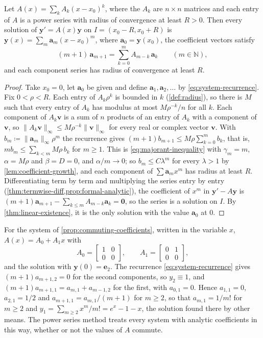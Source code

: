 \begin{proposition}
\label{prop:analytic-systems}
Let $A(x)=\sum_kA_k(x-x_0)^k$, where the $A_k$ are $n\times n$ matrices and each entry of $A$ is a power series with radius of convergence at least $R>0$. Then every solution of $\mathbf y'=A(x)\mathbf y$ on $I=(x_0-R,x_0+R)$ is $\mathbf y(x)=\sum_m\mathbf a_m(x-x_0)^m$, where $\mathbf a_0=\mathbf y(x_0)$, the coefficient vectors satisfy
\begin{equation}
(m+1)\,\mathbf a_{m+1}=\sum_{k=0}^mA_{m-k}\,\mathbf a_k\qquad(m\in\mathbb N),
\label{eq:system-recurrence}
\end{equation}
and each component series has radius of convergence at least $R$.
\end{proposition}

\begin{proof}
Take $x_0=0$, let $\mathbf a_0$ be given and define $\mathbf a_1,\mathbf a_2,\ldots$ by \eqref{eq:system-recurrence}. Fix $0<\rho<R$. Each entry of $A_k\rho^k$ is bounded in $k$ (\cref{def:radius}), so there is $M$ such that every entry of $A_k$ has modulus at most $M\rho^{-k}/n$ for all $k$. Each component of $A_k\mathbf v$ is a sum of $n$ products of an entry of $A_k$ with a component of $\mathbf v$, so $\|A_k\mathbf v\|_\infty\le M\rho^{-k}\|\mathbf v\|_\infty$ for every real or complex vector $\mathbf v$. With $b_m\coloneqq\|\mathbf a_m\|_\infty\rho^m$ the recurrence gives $(m+1)b_{m+1}\le M\rho\sum_{k=0}^mb_k$, that is, $mb_m\le\sum_{k<m}M\rho\,b_k$ for $m\ge1$. This is \eqref{eq:majorant-inequality} with $\gamma_m=m$, $\alpha=M\rho$ and $\beta=D=0$, and $\alpha/m\to0$; so $b_m\le C\lambda^m$ for every $\lambda>1$ by \cref{lem:coefficient-growth}, and each component of $\sum\mathbf a_mx^m$ has radius at least $R$. Differentiating term by term and multiplying the series entry by entry (\cref{thm:termwise-diff,prop:formal-analytic}), the coefficient of $x^m$ in $\mathbf y'-A\mathbf y$ is $(m+1)\mathbf a_{m+1}-\sum_{k\le m}A_{m-k}\mathbf a_k=\mathbf 0$, so the series is a solution on $I$. By \cref{thm:linear-existence}, it is the only solution with the value $\mathbf a_0$ at $0$.
\end{proof}

For the system of \cref{prop:commuting-coefficients}, written in the variable $x$, $A(x)=A_0+A_1x$ with
\[
A_0=\begin{bmatrix}1&0\\0&0\end{bmatrix},\qquad A_1=\begin{bmatrix}0&1\\0&0\end{bmatrix},
\]
and the solution with $\mathbf y(0)=\mathbf e_2$. The recurrence \eqref{eq:system-recurrence} gives $(m+1)a_{m+1,2}=0$ for the second components, so $y_2\equiv1$, and $(m+1)a_{m+1,1}=a_{m,1}+a_{m-1,2}$ for the first, with $a_{0,1}=0$. Hence $a_{1,1}=0$, $a_{2,1}=1/2$ and $a_{m+1,1}=a_{m,1}/(m+1)$ for $m\ge2$, so that $a_{m,1}=1/m!$ for $m\ge2$ and $y_1=\sum_{m\ge2}x^m/m!=e^x-1-x$, the solution found there by other means. The power series method treats every system with analytic coefficients in this way, whether or not the values of $A$ commute.

